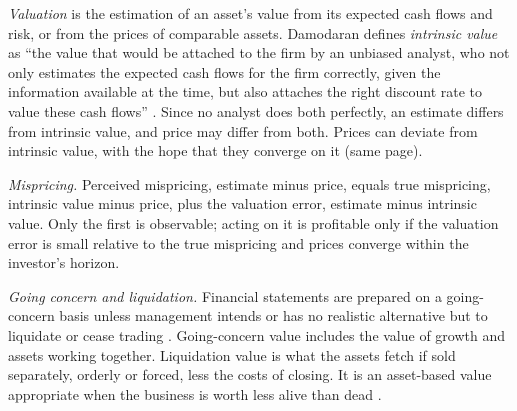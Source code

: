 \begin{qfdefinition}\label{def:intrinsic-value-mispricing}
 \emph{Valuation} is the estimation of an asset's value from its expected cash flows and risk, or from the prices of comparable assets. Damodaran defines \emph{intrinsic value} as ``the value that would be attached to the firm by an unbiased analyst, who not only estimates the expected cash flows for the firm correctly, given the information available at the time, but also attaches the right discount rate to value these cash flows'' \citep[p.~12]{investment-valuation-2012}. Since no analyst does both perfectly, an estimate differs from intrinsic value, and price may differ from both. Prices can deviate from intrinsic value, with the hope that they converge on it (same page).

\emph{Mispricing.} Perceived mispricing, estimate minus price, equals true mispricing, intrinsic value minus price, plus the valuation error, estimate minus intrinsic value. Only the first is observable; acting on it is profitable only if the valuation error is small relative to the true mispricing and prices converge within the investor's horizon.

\emph{Going concern and liquidation.} Financial statements are prepared on a going-concern basis unless management intends or has no realistic alternative but to liquidate or cease trading \citep[IAS~1 para.~25]{eu-2023-1803-ias1}. Going-concern value includes the value of growth and assets working together. Liquidation value is what the assets fetch if sold separately, orderly or forced, less the costs of closing. It is an asset-based value appropriate when the business is worth less alive than dead \citep[p.~22]{investment-valuation-2012}.


\end{qfdefinition}
